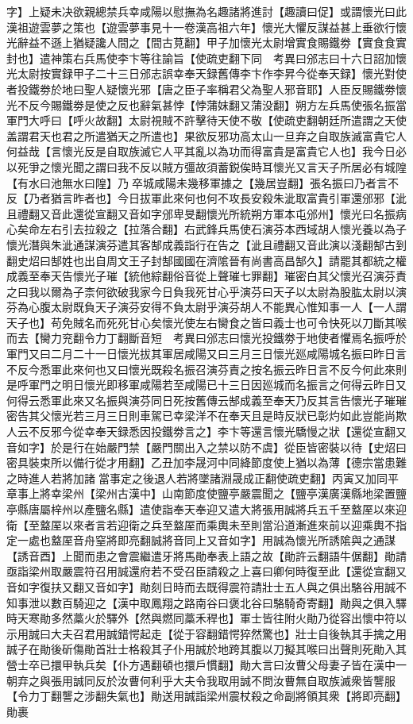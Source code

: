 字】上疑未决欲親總禁兵幸咸陽以慰撫為名趣諸將進討【趣讀曰促】或謂懷光曰此漢祖遊雲夢之策也【遊雲夢事見十一卷漢高祖六年】懷光大懼反謀益甚上垂欲行懷光辭益不遜上猶疑讒人間之【間古莧翻】甲子加懷光太尉增實食賜鐵劵【實食食實封也】遣神策右兵馬使李卞等往諭旨【使疏吏翻下同　考異曰邠志曰十六日詔加懷光太尉按實録甲子二十三日邠志誤幸奉天録舊傳李卞作李昇今從奉天録】懷光對使者投鐵劵於地曰聖人疑懷光邪【唐之臣子率稱君父為聖人邪音耶】人臣反賜鐵劵懷光不反今賜鐵劵是使之反也辭氣甚悖【悖蒲妺翻又蒲没翻】朔方左兵馬使張名振當軍門大呼曰【呼火故翻】太尉視賊不許擊待天使不敬【使疏吏翻朝廷所遣謂之天使盖謂君天也君之所遣猶天之所遣也】果欲反邪功高太山一旦弃之自取族滅富貴它人何益哉【言懷光反是自取族滅它人平其亂以為功而得富貴是富貴它人也】我今日必以死爭之懷光聞之謂曰我不反以賊方彊故須蓄鋭俟時耳懷光又言天子所居必有城隍【有水曰池無水曰隍】乃卒城咸陽未幾移軍據之【幾居豈翻】張名振曰乃者言不反【乃者猶言昨者也】今日拔軍此來何也何不攻長安殺朱泚取富貴引軍還邠邪【泚且禮翻又音此還從宣翻又音如字邠卑旻翻懷光所統朔方軍本屯邠州】懷光曰名振病心矣命左右引去拉殺之【拉落合翻】右武鋒兵馬使石演芬本西域胡人懷光養以為子懷光潛與朱泚通謀演芬遣其客郜成義詣行在告之【泚且禮翻又音此演以淺翻郜古到翻史炤曰郜姓也出自周文王子封郜國國在濟隂晉有尚書高昌郜久】請罷其都統之權成義至奉天告懷光子璀【統他綜翻俗音從上聲璀七罪翻】璀密白其父懷光召演芬責之曰我以爾為子柰何欲破我家今日負我死甘心乎演芬曰天子以太尉為股肱太尉以演芬為心腹太尉既負天子演芬安得不負太尉乎演芬胡人不能異心惟知事一人【一人謂天子也】苟免賊名而死死甘心矣懷光使左右臠食之皆曰義士也可令快死以刀斷其喉而去【臠力兖翻令力丁翻斷音短　考異曰邠志曰懷光投鐵劵于地使者懼焉名振呼於軍門又曰二月二十一日懷光拔其軍居咸陽又曰三月三日懷光廵咸陽城名振曰昨日言不反今悉軍此來何也又曰懷光既殺名振召演芬責之按名振云昨日言不反今何此來則是呼軍門之明日懷光即移軍咸陽若至咸陽已十三日因廵城而名振言之何得云昨日又何得云悉軍此來又名振與演芬同日死按舊傳云郜成義至奉天乃反其言告懷光子璀璀密告其父懷光若三月三日則車駕已幸梁洋不在奉天且是時反狀已彰灼如此豈能尚欺人云不反邪今從幸奉天録悉因投鐵劵言之】李卞等還言懷光驕慢之狀【還從宣翻又音如字】於是行在始嚴門禁【嚴門關出入之禁以防不虞】從臣皆密裝以待【史炤曰密具裝束所以備行從才用翻】乙丑加李晟河中同絳節度使上猶以為薄【德宗當患難之時進人若將加諸當事定之後退人若將墜諸淵晟成正翻使疏吏翻】丙寅又加同平章事上將幸梁州【梁州古漢中】山南節度使鹽亭嚴震聞之【鹽亭漢廣漢縣地梁置鹽亭縣唐屬梓州以產鹽名縣】遣使詣奉天奉迎又遣大將張用誠將兵五千至盩厔以來迎衛【至盩厔以來者言若迎衛之兵至盩厔而乘輿未至則當沿道漸進來前以迎乘輿不指定一處也盩厔音舟窒將即亮翻誠將音同上又音如字】用誠為懷光所誘隂與之通謀【誘音酉】上聞而患之會震繼遣牙將馬勛奉表上語之故【勛許云翻語牛倨翻】勛請亟詣梁州取嚴震符召用誠還府若不受召臣請殺之上喜曰卿何時復至此【還從宣翻又音如字復扶又翻又音如字】勛刻日時而去既得震符請壯士五人與之俱出駱谷用誠不知事泄以數百騎迎之【漢中取鳳翔之路南谷曰褒北谷曰駱騎奇寄翻】勛與之俱入驛時天寒勛多然藁火於驛外【然與燃同藁禾稈也】軍士皆往附火勛乃從容出懷中符以示用誠曰大夫召君用誠錯愕起走【從于容翻錯愕猝然驚也】壯士自後執其手擒之用誠子在勛後斫傷勛首壯士格殺其子仆用誠於地跨其腹以刀擬其喉曰出聲則死勛入其營士卒已擐甲執兵矣【仆方遇翻頓也擐戶慣翻】勛大言曰汝曹父母妻子皆在漢中一朝弃之與張用誠同反於汝曹何利乎大夫令我取用誠不問汝曹無自取族滅衆皆讋服【令力丁翻讋之涉翻失氣也】勛送用誠詣梁州震杖殺之命副將領其衆【將即亮翻】勛裹
